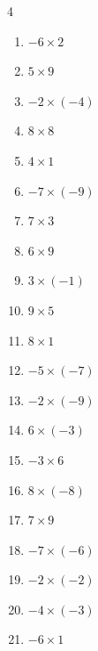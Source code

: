 \begin{multicols}{4}
\begin{enumerate}
  \item $-6\times 2$
        \phantom{$=-12$}

  \item $5\times 9$
        \phantom{$=45$}

  \item $-2\times (-4)$
        \phantom{$=8$}

  \item $8\times 8$
        \phantom{$=64$}

  \item $4\times 1$
        \phantom{$=4$}

  \item $-7\times (-9)$
        \phantom{$=63$}

  \item $7\times 3$
        \phantom{$=21$}

  \item $6\times 9$
        \phantom{$=54$}

\columnbreak %

  \item $3\times (-1)$
        \phantom{$=-3$}

  \item $9\times 5$
        \phantom{$=45$}

  \item $8\times 1$
        \phantom{$=8$}

  \item $-5\times (-7)$
        \phantom{$=35$}

  \item $-2\times (-9)$
        \phantom{$=18$}

  \item $6\times (-3)$
        \phantom{$=-18$}

  \item $-3\times 6$
        \phantom{$=-18$}

  \item $8\times (-8)$
        \phantom{$=-64$}

  \item $7\times 9$
        \phantom{$=63$}

  \item $-7\times (-6)$
        \phantom{$=42$}

  \item $-2\times (-2)$
        \phantom{$=4$}

  \item $-4\times (-3)$
        \phantom{$=12$}

  \item $-6\times 1$
        \phantom{$=-6$}


\end{enumerate}
\end{multicols}
